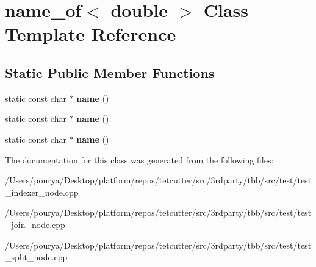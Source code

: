 \hypertarget{classname__of_3_01double_01_4}{}\section{name\+\_\+of$<$ double $>$ Class Template Reference}
\label{classname__of_3_01double_01_4}
\subsection*{Static Public Member Functions}
\begin{DoxyCompactItemize}
\item 
\hypertarget{classname__of_3_01double_01_4_ad8a7e6fa7b2523dca45b52110422d5f9}{}static const char $\ast$ {\bfseries name} ()\label{classname__of_3_01double_01_4_ad8a7e6fa7b2523dca45b52110422d5f9}

\item 
\hypertarget{classname__of_3_01double_01_4_ad8a7e6fa7b2523dca45b52110422d5f9}{}static const char $\ast$ {\bfseries name} ()\label{classname__of_3_01double_01_4_ad8a7e6fa7b2523dca45b52110422d5f9}

\item 
\hypertarget{classname__of_3_01double_01_4_ad8a7e6fa7b2523dca45b52110422d5f9}{}static const char $\ast$ {\bfseries name} ()\label{classname__of_3_01double_01_4_ad8a7e6fa7b2523dca45b52110422d5f9}

\end{DoxyCompactItemize}


The documentation for this class was generated from the following files\+:\begin{DoxyCompactItemize}
\item 
/\+Users/pourya/\+Desktop/platform/repos/tetcutter/src/3rdparty/tbb/src/test/test\+\_\+indexer\+\_\+node.\+cpp\item 
/\+Users/pourya/\+Desktop/platform/repos/tetcutter/src/3rdparty/tbb/src/test/test\+\_\+join\+\_\+node.\+cpp\item 
/\+Users/pourya/\+Desktop/platform/repos/tetcutter/src/3rdparty/tbb/src/test/test\+\_\+split\+\_\+node.\+cpp\end{DoxyCompactItemize}
